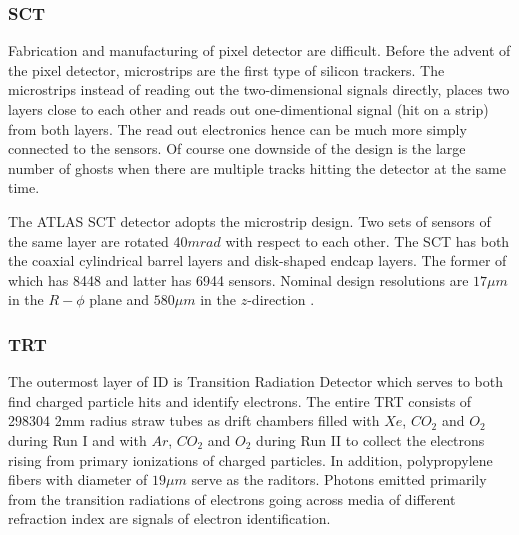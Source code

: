 \subsubsection{SCT}

Fabrication and manufacturing of pixel detector are difficult. Before the advent of the pixel detector, microstrips are the first type of silicon trackers. The microstrips instead of reading out the two-dimensional signals directly, places two layers close to each other and reads out one-dimentional signal (hit on a strip) from both layers. The read out electronics hence can be much more simply connected to the sensors. Of course one downside of the design is the large number of ghosts when there are multiple tracks hitting the detector at the same time.

The ATLAS SCT detector adopts the microstrip design. Two sets of sensors of the same layer are rotated 40$mrad$ with respect to each other. The SCT has both the coaxial cylindrical barrel layers and disk-shaped endcap layers. The former of which has 8448 and latter has 6944 sensors\cite{SCTpaper}. Nominal design resolutions are $17\mu m$ in the $R-\phi$ plane and $580 \mu m$ in the $z$-direction \cite{PERF-2007-01}.


\subsubsection{TRT}

The outermost layer of ID is Transition Radiation Detector which serves to both find charged particle hits and identify electrons. The entire TRT consists of 298304 2mm radius straw tubes\cite{TRTpaper} as drift chambers filled with $Xe$, $CO_2$ and $O_2$ during Run I and with $Ar$, $CO_2$ and $O_2$ during Run II to collect the electrons rising from primary ionizations of charged particles. In addition, polypropylene fibers with diameter of $19\mu m$ serve as the raditors. Photons emitted primarily from the transition radiations of electrons going across media of different refraction index are signals of electron identification.
